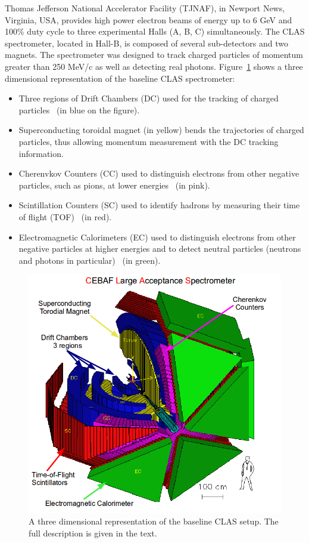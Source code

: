 \documentclass[twocolumn,showpacs,superscriptaddress,groupedaddress]{revtex4}
\begin{document}
Thomas Jefferson National Accelerator Facility (TJNAF),
in Newport News, Virginia, USA, provides 
high power electron beams of energy up to 6 GeV and 100$\%$ duty cycle to 
three experimental Halls (A, B, C) simultaneously. The CLAS spectrometer, located in Hall-B, 
is composed of several sub-detectors and two magnets. The spectrometer was 
designed to track charged particles of momentum greater than 250 MeV/c as well 
as detecting real photons. Figure~\ref{fig:CLAS} shows a three dimensional 
representation of the baseline CLAS spectrometer:
\begin{itemize}
 \item Three regions of Drift Chambers (DC) used for the tracking of charged 
    particles~\cite{DCref} (in blue on the figure).
 \item Superconducting toroidal magnet (in yellow) bends the trajectories 
    of charged particles, thus allowing momentum measurement with the DC tracking information.
 \item Cherenvkov Counters (CC) used to distinguish electrons from other negative 
    particles, such as pions, at lower energies~\cite{CCref} (in pink).
 \item Scintillation Counters (SC) used to identify hadrons by measuring their 
    time of flight (TOF)~\cite{TOFref} (in red).
 \item Electromagnetic Calorimeters (EC) used to distinguish electrons from other negative 
    particles at higher energies and to detect neutral particles (neutrons and 
    photons in particular)~\cite{ECref} (in green).
\end{itemize}

\begin{figure}[tbp]
\centering \includegraphics[scale=0.3]{fig/test_clas.png}
\caption{A three dimensional representation of the baseline CLAS setup. The
   full description is given in the text.} \label{fig:CLAS}
\end{figure}
\end{document}
